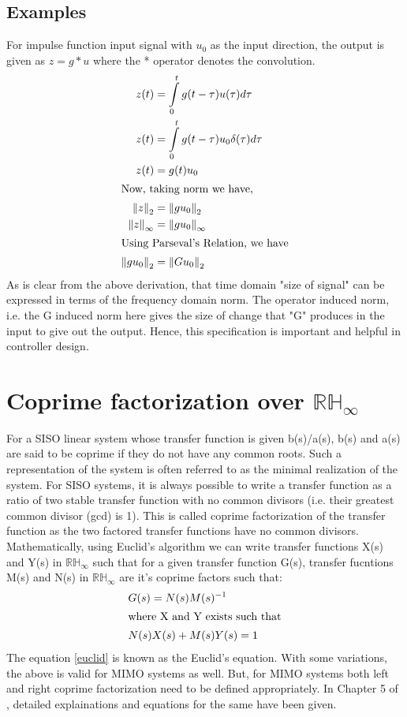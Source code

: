 \documentclass[a4paper,12pt]{article}
\newcommand\norm[1]{\left\lVert#1\right\rVert}
\begin{document}
	\subsection{Examples}
	For impulse function input signal with $u_{0}$ as the input direction, the output is given as $z=g*u$ where the * operator denotes the convolution. 
	\begin{align*}
		z(t) &= \int\limits_{0}^t g(t-\tau)u(\tau)d\tau\\
		z(t) &= \int\limits_{0}^t g(t-\tau)u_{0}\delta(\tau)d\tau\\
		z(t) &= g(t)u_{0}\\
		\intertext{Now, taking norm we have,}
		\norm{z}_{2} &= \norm{gu_{0}}_{2}\\
		\norm{z}_{\infty} &= \norm{gu_{0}}_{\infty}\\
		\intertext{Using Parseval's Relation, we have}
		\norm{gu_{0}}_{2} &= \norm{Gu_{0}}_{2}\\
	\end{align*}
	As is clear from the above derivation, that time domain "size of signal" can be expressed in terms of the frequency domain norm. The operator induced norm, i.e. the G induced norm here gives the size of change that "G" produces in the input to give out the output. Hence, this specification is important and helpful in controller design.
	\section{Coprime factorization over $\mathbb{RH_{\infty}}$} For a SISO linear system whose transfer function is given b(s)/a(s), b(s) and a(s) are said to be coprime if they do not have any common roots. Such a representation of the system is often referred to as the minimal realization of the system. For SISO systems, it is always possible to write a transfer function as a ratio of two stable transfer function with no common divisors (i.e. their greatest common divisor (gcd) is 1). This is called coprime factorization of the transfer function as the two factored transfer functions have no common divisors. Mathematically, using Euclid's algorithm we can write transfer functions X(s) and Y(s) in $\mathbb{RH_{\infty}}$ such that for a given transfer function G(s), transfer fucntions M(s) and N(s) in $\mathbb{RH_{\infty}}$ are it's coprime factors such that:
	\begin{align}
		&G(s) = N(s)M(s)^{-1}\\
		\intertext{where X and Y exists such that}
		&N(s)X(s)+M(s)Y(s)=1
		\label{euclid}
	\end{align}
	The equation \ref{euclid} is known as the Euclid's equation. With some variations, the above is valid for MIMO systems as well. But, for MIMO systems both left and right coprime factorization need to be defined appropriately. In Chapter 5 of \cite{book}, detailed explainations and equations for the same have been given.
\end{document}
